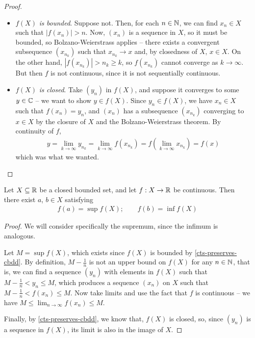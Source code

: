 \documentclass{../../template/note}
\begin{document}
    \begin{proof}
        \begin{itemize}
            \item \emph{\(f(X)\) is bounded}. Suppose not. Then, for each \(n \in \mathbb N\), we can find \(x_n \in X\) such that \(|f(x_n)| > n\). Now, \((x_n)\) is a sequence in \(X\), so it must be bounded, so Bolzano-Weierstrass applies -- there exists a convergent subsequence \((x_{n_k})\) such that \(x_{n_k} \to x\) and, by closedness of \(X\), \(x \in X\). On the other hand, \(|f(x_{n_k})| > n_k \geq k\), so \(f(x_{n_k})\) cannot converge as \(k \to \infty\). But then \(f\) is not continuous, since it is not sequentially continuous.
            \item \emph{\(f(X)\) is closed}. Take \((y_n)\) in \(f(X)\), and suppose it converges to some \(y \in \mathbb C\) -- we want to show \(y \in f(X)\). Since \(y_n \in f(X)\), we have \(x_n \in X\) such that \(f(x_n) = y_n\), and \((x_n)\) has a subsequence \((x_{n_k})\) converging to \(x \in X\) by the closure of \(X\) and the Bolzano-Weierstrass theorem. By continuity of \(f\),
            \begin{align*}
                y = \lim_{k \to \infty} y_{n_k} = \lim_{k \to \infty} f(x_{n_k}) = f\left(\lim_{k \to \infty} x_{n_k}\right) = f(x)
            \end{align*}
            which was what we wanted.            
        \end{itemize}
        
        
    \end{proof}
    

    \begin{theorem}
        \label{evt}
        Let \(X \subseteq \mathbb R\) be a closed bounded set, and let \(f: X \to \mathbb R\) be continuous. Then there exist \(a\), \(b \in X\) satisfying
        \begin{align*}
            f(a) = \sup f(X); \qquad f(b) = \inf f(X)
        \end{align*}
    \end{theorem}

    
    \begin{proof}
        We will consider specifically the supremum, since the infimum is analogous.

        Let \(M = \sup f(X)\), which exists since \(f(X)\) is bounded by \cref{cts-preserves-cbdd}. By definition, \(M - \frac 1 n\) is not an upper bound on \(f(X)\) for any \(n \in \mathbb N\), that is, we can find a sequence \((y_n)\) with elements in \(f(X)\) such that \(M - \frac 1 n < y_n \leq M\), which produces a sequence \((x_n)\) on \(X\) such that \(M - \frac 1 n < f(x_n) \leq M\). Now take limits and use the fact that \(f\) is continuous -- we have \(M \leq \lim_{n \to \infty} f(x_n) \leq M\).

        Finally, by \cref{cts-preserves-cbdd}, we know that, \(f(X)\) is closed, so, since \((y_n)\) is a sequence in \(f(X)\), its limit is also in the image of \(X\).        
    \end{proof}
\end{document}
